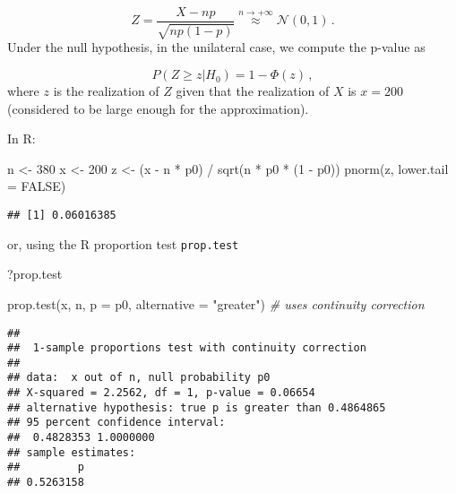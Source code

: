 \documentclass[
  oneside]{book}
\newenvironment{Shaded}{\begin{snugshade}}{\end{snugshade}}
\newcommand{\AttributeTok}[1]{\textcolor[rgb]{0.77,0.63,0.00}{#1}}
\newcommand{\CommentTok}[1]{\textcolor[rgb]{0.56,0.35,0.01}{\textit{#1}}}
\newcommand{\ConstantTok}[1]{\textcolor[rgb]{0.00,0.00,0.00}{#1}}
\newcommand{\DecValTok}[1]{\textcolor[rgb]{0.00,0.00,0.81}{#1}}
\newcommand{\FunctionTok}[1]{\textcolor[rgb]{0.00,0.00,0.00}{#1}}
\newcommand{\NormalTok}[1]{#1}
\newcommand{\OtherTok}[1]{\textcolor[rgb]{0.56,0.35,0.01}{#1}}
\newcommand{\SpecialCharTok}[1]{\textcolor[rgb]{0.00,0.00,0.00}{#1}}
\newcommand{\StringTok}[1]{\textcolor[rgb]{0.31,0.60,0.02}{#1}}
\begin{document}
\[
Z = \frac{X - np}{\sqrt{np(1-p)}} \stackrel{n\rightarrow +\infty}{\approx} \mathcal
N(0,1)\,.
\]
Under the null hypothesis, in the unilateral case, we compute the p-value as

\[
P(Z \geq z | H_0) = 1 - \Phi(z)\,,
\]
where \(z\) is the realization of \(Z\) given that the realization of
\(X\) is \(x = 200\) (considered to be large enough for the approximation).

In R:

\begin{Shaded}
\begin{Highlighting}[]
\NormalTok{n }\OtherTok{\textless{}{-}} \DecValTok{380}
\NormalTok{x }\OtherTok{\textless{}{-}} \DecValTok{200}
\NormalTok{z }\OtherTok{\textless{}{-}}\NormalTok{ (x }\SpecialCharTok{{-}}\NormalTok{ n }\SpecialCharTok{*}\NormalTok{ p0) }\SpecialCharTok{/} \FunctionTok{sqrt}\NormalTok{(n }\SpecialCharTok{*}\NormalTok{ p0 }\SpecialCharTok{*}\NormalTok{ (}\DecValTok{1} \SpecialCharTok{{-}}\NormalTok{ p0))}
\FunctionTok{pnorm}\NormalTok{(z, }\AttributeTok{lower.tail =} \ConstantTok{FALSE}\NormalTok{)}
\end{Highlighting}
\end{Shaded}

\begin{verbatim}
## [1] 0.06016385
\end{verbatim}

or, using the R proportion test \texttt{prop.test}

\begin{Shaded}
\begin{Highlighting}[]
\NormalTok{?prop.test}
\end{Highlighting}
\end{Shaded}

\begin{Shaded}
\begin{Highlighting}[]
\FunctionTok{prop.test}\NormalTok{(x, n, }\AttributeTok{p =}\NormalTok{ p0, }\AttributeTok{alternative =} \StringTok{"greater"}\NormalTok{) }\CommentTok{\# uses continuity correction}
\end{Highlighting}
\end{Shaded}

\begin{verbatim}
## 
##  1-sample proportions test with continuity correction
## 
## data:  x out of n, null probability p0
## X-squared = 2.2562, df = 1, p-value = 0.06654
## alternative hypothesis: true p is greater than 0.4864865
## 95 percent confidence interval:
##  0.4828353 1.0000000
## sample estimates:
##         p 
## 0.5263158
\end{verbatim}
\end{document}

